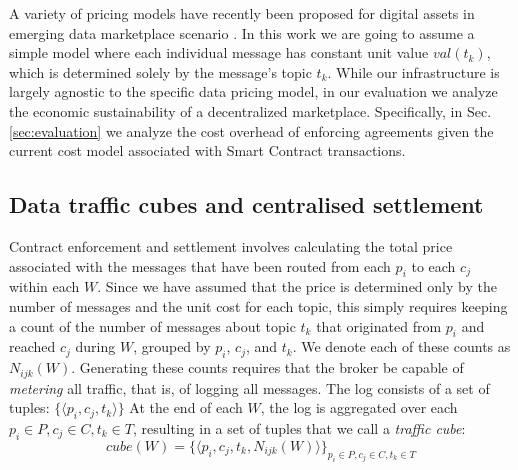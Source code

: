 \documentclass[chi_draft]{sigchi}
\begin{document}



A variety of pricing models have recently been proposed for digital assets in emerging data marketplace scenario \cite{Sen:2015:SDP:2847579.2756543,Li:2014:TPP:2691190.2691191,7553037,7437020}.
In this work we are going to assume a simple model where each individual message has constant unit value $\mathit{val}(t_k)$, which is determined solely by the message's topic $t_k$. 
While our infrastructure is largely agnostic to the specific data pricing model, in our evaluation we analyze the economic sustainability of a decentralized marketplace. Specifically, in Sec.\ref{sec:evaluation} we analyze the cost overhead of enforcing agreements given the current cost model associated with Smart Contract transactions.

\subsection{Data traffic cubes and centralised settlement}

Contract enforcement and settlement involves calculating the total price associated with the messages that have been routed from each $ p_i $ to each $ c_j $ within each $W$.
Since we have assumed that the price is  determined only by the number of messages and the unit cost for each topic, this simply requires keeping a count of the number of messages about topic $t_k$ that originated from $p_i$ and reached $c_j$ during $W$, grouped by $ p_i $, $ c_j $, and $ t_k $.
We denote each of these counts as $N_{ijk}(W)$.
%
Generating these counts requires that the broker be capable of \textit{metering} all traffic, that is, of logging all messages.
The log consists of a set of tuples:
$ \{\langle p_i, c_j, t_k \rangle  \} $
%
At the end of each $W$, the log is aggregated over each $p_i \in P, c_j \in C, t_k \in T$, resulting in a set of tuples that we call a \textit{traffic cube}:
\begin{equation}\label{eq:cube}
\mathit{cube}(W) = \{ \langle p_i, c_j, t_k, N_{ijk}(W) \rangle \}_{p_i \in P, c_j \in C, t_k \in T}
\end{equation}
\end{document}
